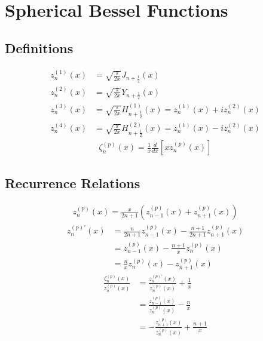 \section{Spherical Bessel Functions}

\subsection{Definitions}

\begin{subequations}
\begin{align}
z_{n}^{(1)}(x) &= \sqrt{ \frac{\pi}{2x} } J_{n + \frac{1}{2}}(x)
\\
z_{n}^{(2)}(x) &= \sqrt{ \frac{\pi}{2x} } Y_{n + \frac{1}{2}}(x)
\\
z_{n}^{(3)}(x) &= \sqrt{ \frac{\pi}{2x} } H_{n + \frac{1}{2}}^{(1)}(x) = z_{n}^{(1)}(x) + i z_{n}^{(2)}(x)
\\
z_{n}^{(4)}(x) &= \sqrt{ \frac{\pi}{2x} } H_{n + \frac{1}{2}}^{(2)}(x) = z_{n}^{(1)}(x) - i z_{n}^{(2)}(x)
\end{align}
\end{subequations}
%
\begin{align}
\zeta_{n}^{(p)}(x) = \frac{1}{x} \frac{d}{dx} \left[ x z_{n}^{(p)}(x) \right]
\end{align}


\subsection{Recurrence Relations}

\begin{align}
z_{n}^{(p)}(x) = \frac{x}{2n+1} \left( z_{n-1}^{(p)}(x) + z_{n+1}^{(p)}(x) \right)
\end{align}
%
\begin{equation}
\begin{split}
z_{n}^{(p)\prime}(x) &= \frac{n}{2n+1} z_{n-1}^{(p)}(x) - \frac{n+1}{2n+1} z_{n+1}^{(p)}(x)
\\
&= z_{n-1}^{(p)}(x) - \frac{n+1}{x} z_{n}^{(p)}(x)
\\
&= \frac{n}{x} z_{n}^{(p)}(x) - z_{n+1}^{(p)}(x)
\end{split}
\end{equation}
%
\begin{equation}
\begin{split}
\frac{\zeta_{n}^{(p)}(x)}{z_{n}^{(p)}(x)}
&= \frac{z_{n}^{(p)\prime}(x)}{z_{n}^{(p)}(x)} + \frac{1}{x}
\\
&= \frac{z_{n-1}^{(p)}(x)}{z_{n}^{(p)}(x)} - \frac{n}{x}
\\
&= - \frac{z_{n+1}^{(p)}(x)}{z_{n}^{(p)}(x)} + \frac{n+1}{x}
\end{split}
\end{equation}


